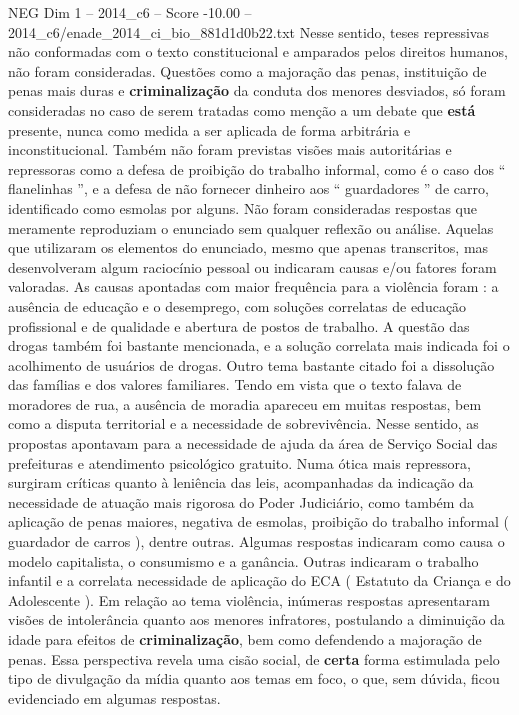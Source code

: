 \begin{textsample}{NEG Dim 1 – 2014\_c6 – Score -10.00 – 2014\_c6/enade\_2014\_ci\_bio\_881d1d0b22.txt}
Nesse sentido, teses repressivas não conformadas com o texto constitucional e amparados pelos direitos humanos, não foram consideradas.
Questões como a majoração das penas, instituição de penas mais duras e \textbf{criminalização} da conduta dos menores desviados, só foram consideradas no caso de serem tratadas como menção a um debate que \textbf{está} presente, nunca como medida a ser aplicada de forma arbitrária e inconstitucional.
Também não foram previstas visões mais autoritárias e repressoras como a defesa de proibição do trabalho informal, como é o caso dos “ flanelinhas ”, e a defesa de não fornecer dinheiro aos “ guardadores ” de carro, identificado como esmolas por alguns.
Não foram consideradas respostas que meramente reproduziam o enunciado sem qualquer reflexão ou análise.
Aquelas que utilizaram os elementos do enunciado, mesmo que apenas transcritos, mas desenvolveram algum raciocínio pessoal ou indicaram causas e/ou fatores foram valoradas.
As causas apontadas com maior frequência para a violência foram : a ausência de educação e o desemprego, com soluções correlatas de educação profissional e de qualidade e abertura de postos de trabalho.
A questão das drogas também foi bastante mencionada, e a solução correlata mais indicada foi o acolhimento de usuários de drogas.
Outro tema bastante citado foi a dissolução das famílias e dos valores familiares.
Tendo em vista que o texto falava de moradores de rua, a ausência de moradia apareceu em muitas respostas, bem como a disputa territorial e a necessidade de sobrevivência.
Nesse sentido, as propostas apontavam para a necessidade de ajuda da área de Serviço Social das prefeituras e atendimento psicológico gratuito.
Numa ótica mais repressora, surgiram críticas quanto à leniência das leis, acompanhadas da indicação da necessidade de atuação mais rigorosa do Poder Judiciário, como também da aplicação de penas maiores, negativa de esmolas, proibição do trabalho informal ( guardador de carros ), dentre outras.
Algumas respostas indicaram como causa o modelo capitalista, o consumismo e a ganância.
Outras indicaram o trabalho infantil e a correlata necessidade de aplicação do ECA ( Estatuto da Criança e do Adolescente ).
Em relação ao tema violência, inúmeras respostas apresentaram visões de intolerância quanto aos menores infratores, postulando a diminuição da idade para efeitos de \textbf{criminalização}, bem como defendendo a majoração de penas.
Essa perspectiva revela uma cisão social, de \textbf{certa} forma estimulada pelo tipo de divulgação da mídia quanto aos temas em foco, o que, sem dúvida, ficou evidenciado em algumas respostas.

\end{textsample}
